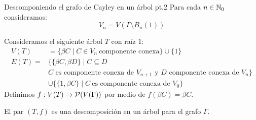 \documentclass[aspectratio=169, 11pt]{beamer}
\begin{document}
	\begin{frame}[fragile]{Descomponiendo el grafo de Cayley en un árbol pt.2}
		Para cada $n \in \mathbb{N}_{0}$ consideramos:
		\[
			V_{n} = V(\Gamma \setminus B_{n}(1))	
		\]

		Consideramos el siguiente árbol $T$ con raíz $1$:
		\begin{align*}
			V(T)  & = \{ \beta C \mid C \in V_{n} \ \text{componente conexa} \}  \cup \{ 1 \} \\
			E(T)  =  & \{ \{ \beta C, \beta D \}  \mid C \subseteq D \\ 
			& \text{$C$ es componente conexa de $V_{n+1}$ y $D$ componente conexa de $V_{n}$} \} \\
			& \cup \{ \{1, \beta C\} \mid C \ \text{es componente conexa de $V_{0}$} \}
		\end{align*}
		Definimos $f: V(T) \to {\cal{P}}(V(\Gamma))$ por medio de $f(\beta C) = \beta C$.
		\begin{lema}
			El par $(T,f)$ es una descomposición en un árbol para el grafo $\Gamma$.
		\end{lema}
	\end{frame}
\end{document}
